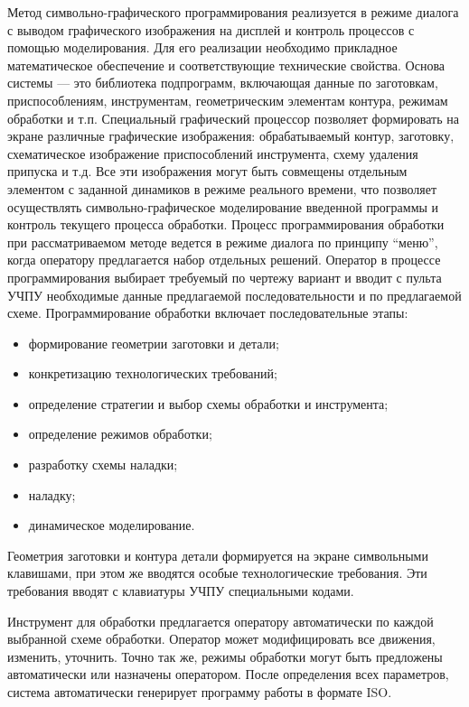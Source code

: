 Метод символьно-графического программирования реализуется в режиме диалога с выводом графического изображения на дисплей и контроль процессов с помощью моделирования. Для его реализации необходимо прикладное математическое обеспечение и соответствующие технические свойства. Основа системы --- это библиотека подпрограмм, включающая данные по заготовкам, приспособлениям, инструментам, геометрическим элементам контура, режимам обработки и т.п. Специальный графический процессор позволяет формировать на экране различные графические изображения: обрабатываемый контур, заготовку, схематическое изображение приспособлений инструмента, схему удаления припуска и т.д. Все эти изображения могут быть совмещены отдельным элементом с заданной динамиков в режиме реального времени, что позволяет осуществлять символьно-графическое моделирование введенной программы и контроль текущего процесса обработки. Процесс программирования обработки при рассматриваемом методе ведется в режиме диалога по принципу ``меню'', когда оператору предлагается набор отдельных решений. Оператор в процессе программирования выбирает требуемый по чертежу вариант и вводит с пульта УЧПУ необходимые данные предлагаемой последовательности и по предлагаемой схеме. Программирование обработки включает последовательные этапы:

\begin{itemize}
    \item формирование геометрии заготовки и детали;
    \item конкретизацию технологических требований;
    \item определение стратегии и выбор схемы обработки и инструмента;
    \item определение режимов обработки;
    \item разработку схемы наладки;
    \item наладку;
    \item динамическое моделирование.
\end{itemize}

Геометрия заготовки и контура детали формируется на экране символьными клавишами, при этом же вводятся особые технологические требования. Эти требования вводят с клавиатуры УЧПУ специальными кодами.

Инструмент для обработки предлагается оператору автоматически по каждой выбранной схеме обработки. Оператор может модифицировать все движения, изменить, уточнить. Точно так же, режимы обработки могут быть предложены автоматически или назначены оператором. После определения всех параметров, система автоматически генерирует программу работы в формате ISO.


